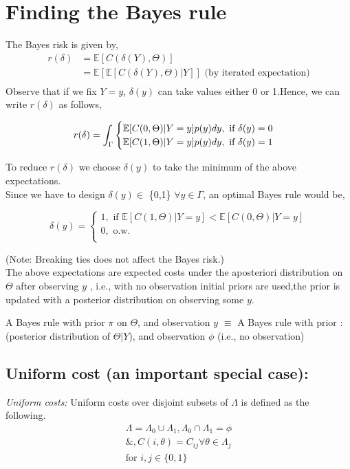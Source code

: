 \documentclass[12pt]{report}
\begin{document}
\section{Finding the Bayes rule}
The Bayes risk is given by,
\begin{align*}
r(\delta) &= \mathbb{E}[C(\delta(Y),\Theta)]\\
&= \mathbb{E}[\mathbb{E}[C(\delta(Y),\Theta)|Y]] \text{ (by iterated expectation)}\\
\end{align*}
Observe that if we fix $Y=y$, $\delta(y)$ can take values either 0 or 1.Hence, we can write $r(\delta)$ as follows,

\begin{equation}
r(\delta)={\Large \int_{\Gamma}}
\begin{cases}
\mathbb{E}[C(0,\Theta)|Y=y]p(y)dy, \text{  if } \delta(y)=0\\
\mathbb{E}[C(1,\Theta)|Y=y]p(y)dy, \text{  if } \delta(y)=1\\
\end{cases}
\end{equation}

\noindent To reduce $r(\delta)$ we choose $\delta(y)$ to take the minimum of the above expectations.\\
Since we have to design $\delta(y) \in$ \{0,1\} $\forall y \in \Gamma$, an optimal Bayes rule would be,

\begin{equation}
\delta(y)=
\begin{cases}
1, \text{ if }\mathbb{E}[C(1,\Theta)|Y=y]< \mathbb{E}[C(0,\Theta)|Y=y]\\
0, \text{ o.w.}\\
\end{cases}
\end{equation}

(Note: Breaking ties does not affect the Bayes risk.)\\
The above expectations are expected costs under the aposteriori distribution on $\Theta$ after observing $y$ , i.e., with no observation initial priors are used,the prior is updated with a posterior distribution on observing some $y$. 
\begin{rem}
A Bayes rule with prior $\pi$ on $\Theta$, and observation $y$ $\equiv$ A Bayes rule with prior : (posterior distribution of $\Theta|Y$), and observation $\phi$ (i.e., no observation)
\end{rem}

\subsection{Uniform cost (an important special case):}
{\em Uniform costs:}  Uniform costs over disjoint subsets of $\Lambda$ is defined as the following.
\begin{align*}
\Lambda = \Lambda_0 \cup \Lambda_1 , \Lambda_0 \cap \Lambda_1= \phi\\ 
\&,C(i,\theta)=C_{ij} \forall \theta \in \Lambda_j\\
\text{for } i,j \in \{0,1\}\\
\end{align*}
\end{document}
